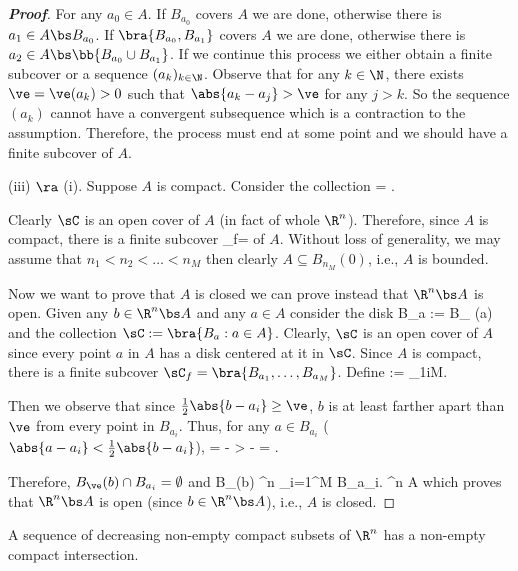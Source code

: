 \begin{proof}[\bf Proof]
For any $a_0\in A$. If $B_{a_0}$ covers $A$ we are done, otherwise there is $a_1\in A\bs B_{a_0}$. If $\bra{B_{a_0},B_{a_1}}$ covers $A$ we are done, otherwise there is $a_2\in A\bs\bb{B_{a_0}\cup B_{a_1}}$. If we continue this process we either obtain a finite subcover or a sequence $(a_k)_{k\in \N}$. Observe that for any $k\in \N$, there exists $\ve = \ve(a_k)>0$ such that $\abs{a_k - a_j}>\ve$ for any $j>k$. So the sequence $(a_k)$ cannot have a convergent subsequence which is a contraction to the assumption. Therefore, the process must end at some point and we should have a finite subcover of $A$.


\item [(iii)] $\ra$ (i). Suppose $A$ is compact. Consider the collection
\be
\sC = .
\ee

Clearly $\sC$ is an open cover of $A$ (in fact of whole $\R^n$). Therefore, since $A$ is compact, there is a finite subcover
\be
\sC_f= 
\ee
of $A$. Without loss of generality, we may assume that $n_1<n_2 < \dots < n_M$ then clearly $A \subseteq B_{n_M}(0)$, i.e., $A$ is bounded.

Now we want to prove that $A$ is closed we can prove instead that $\R^n\bs A$ is open. Given any $b\in \R^n\bs A$ and any $a\in A$ consider the disk
\be
B_a := B_{ }(a)
\ee
and the collection $\sC := \bra{B_a : a\in A}$. Clearly, $\sC$ is an open cover of $A$ since every point $a$ in $A$ has a disk centered at it in $\sC$. Since $A$ is compact, there is a finite subcover $\sC_f = \bra{B_{a_1},\dots,B_{a_M}}$. Define
\be
\ve := \min_{1\leq i\leq M}.
\ee

Then we observe that since $\frac 12 \abs{b - a_i} \geq \ve$, $b$ is at least farther apart than $\ve$ from every point in $B_{a_i}$. Thus, for any $a\in B_{a_i}$ ($\abs{a-a_i} < \frac 12 \abs{b-a_i}$),
\be
{} =  \geq {} -  >  -   =   \geq \ve.
\ee

Therefore, $B_{\ve}(b) \cap B_{a_i}= \emptyset$ and
\be
B_{\ve}(b) \subseteq \R^n \left\bs \bigcup_{i=1}^M B_{a_i}\right. \subseteq \R^n \bs A
\ee
which proves that $\R^n\bs A$ is open (since $b\in \R^n\bs A$), i.e., $A$ is closed.
\een
\end{proof}

\begin{theorem}\label{thm:intersection_of_decreasing_non_empty_compact_sets_in_real_n_non_emptyset_compact}
A sequence of decreasing non-empty compact subsets of $\R^n$ has a non-empty compact intersection.
\end{theorem}

